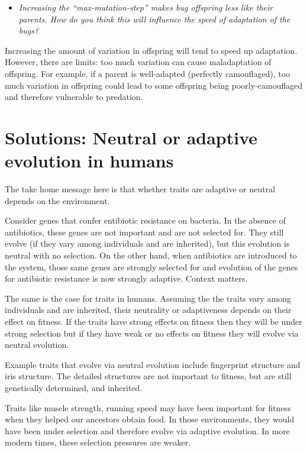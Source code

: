 \documentclass[
  a4paper]{book}
\providecommand{\tightlist}{%
  \setlength{\itemsep}{0pt}\setlength{\parskip}{0pt}}
\begin{document}
\begin{itemize}
\tightlist
\item
  \emph{Increasing the ``max-mutation-step'' makes bug offspring less
  like their parents. How do you think this will influence the speed of
  adaptation of the bugs?}
\end{itemize}

Increasing the amount of variation in offspring will tend to speed up
adaptation. However, there are limits: too much variation can cause
maladaptation of offspring. For example, if a parent is well-adapted
(perfectly camouflaged), too much variation in offspring could lead to
some offspring being poorly-camouflaged and therefore vulnerable to
predation.

\hypertarget{solutions-neutral-or-adaptive-evolution-in-humans}{%
\section{Solutions: Neutral or adaptive evolution in
humans}\label{solutions-neutral-or-adaptive-evolution-in-humans}}

The take home message here is that whether traits are adaptive or
neutral depends on the environment.

Consider genes that confer entibiotic resistance on bacteria. In the
absence of antibiotics, these genes are not important and are not
selected for. They still evolve (if they vary among individuals and are
inherited), but this evolution is neutral with no selection. On the
other hand, when antibiotics are introduced to the system, those same
genes are strongly selected for and evolution of the genes for
antibiotic resistance is now strongly adaptive. Context matters.

The same is the case for traits in humans. Assuming the the traits vary
among individuals and are inherited, their neutrality or adaptiveness
depends on their effect on fitness. If the traits have strong effects on
fitness then they will be under strong selection but if they have weak
or no effects on fitness they will evolve via neutral evolution.

Example traits that evolve via neutral evolution include fingerprint
structure and iris structure. The detailed structures are not important
to fitness, but are still genetically determined, and inherited.

Traits like muscle strength, running speed may have been important for
fitness when they helped our ancestors obtain food. In those
environments, they would have been under selection and therefore evolve
via adaptive evolution. In more modern times, these selection pressures
are weaker.
\end{document}

